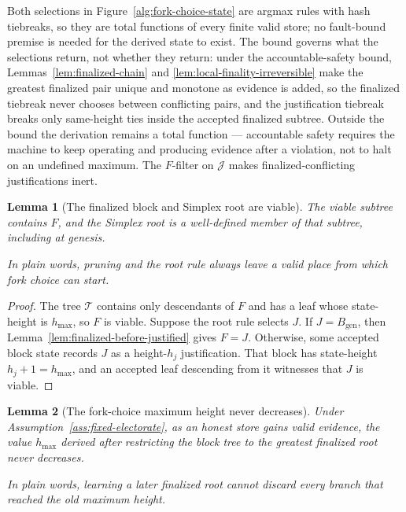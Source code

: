 \ifx\litemode\undefined\documentclass{article}\fi
\theoremstyle{plain}
\newtheorem{lemma}{Lemma}
\theoremstyle{definition}
\theoremstyle{remark}
\newcommand{\genesis}{B_{\mathrm{gen}}}
\newcommand{\T}{\mathcal{T}}
\begin{document}
Both selections in Figure~\ref{alg:fork-choice-state} are argmax rules
with hash tiebreaks, so they are total functions of every finite valid
store; no fault-bound premise is needed for the derived state to exist.
The bound governs what the selections return, not whether they return:
under the accountable-safety bound, Lemmas~\ref{lem:finalized-chain} and
\ref{lem:local-finality-irreversible} make the greatest finalized pair
unique and monotone as evidence is added, so the finalized tiebreak never
chooses between conflicting pairs, and the justification tiebreak breaks
only same-height ties inside the accepted finalized subtree.  Outside the
bound the derivation remains a total function --- accountable safety
requires the machine to keep operating and producing evidence after a
violation, not to halt on an undefined maximum.  The \(F\)-filter on
\(\mathcal J\) makes finalized-conflicting justifications inert.

\begin{lemma}[The finalized block and Simplex root are viable]
\label{lem:finalized-root-viable}
The viable subtree contains \(F\), and the Simplex root is a well-defined
member of that subtree, including at genesis.

In plain words, pruning and the root rule always leave a valid place from
which fork choice can start.
\end{lemma}

\begin{proof}
The tree \(\T\) contains only descendants of \(F\) and has a leaf whose
state-height is \(h_{\max}\), so \(F\) is viable.  Suppose the root rule
selects \(J\).  If \(J=\genesis\), then
Lemma~\ref{lem:finalized-before-justified} gives \(F=J\).  Otherwise, some
accepted block state records \(J\) as a height-\(h_j\) justification.  That
block has state-height \(h_j+1=h_{\max}\), and an accepted leaf descending
from it witnesses that \(J\) is viable.
\end{proof}

\begin{lemma}[The fork-choice maximum height never decreases]
\label{lem:filtered-hmax-monotone}
Under Assumption~\ref{ass:fixed-electorate}, as an honest store gains valid
evidence, the value \(h_{\max}\) derived after restricting the block tree to
the greatest finalized root never decreases.

In plain words, learning a later finalized root cannot discard every branch
that reached the old maximum height.
\end{lemma}
\end{document}
